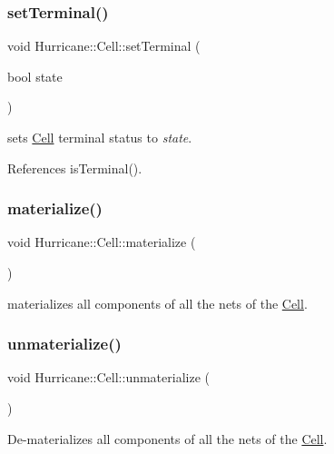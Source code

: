 \subsubsection{\texorpdfstring{set\+Terminal()}{setTerminal()}}
{\footnotesize\ttfamily void Hurricane\+::\+Cell\+::set\+Terminal (\begin{DoxyParamCaption}\item[{bool}]{state }\end{DoxyParamCaption})\hspace{0.3cm}{\ttfamily [inline]}}

sets \mbox{\hyperlink{classHurricane_1_1Cell}{Cell}} terminal status to {\itshape state}. 

References is\+Terminal().

\mbox{\label{classHurricane_1_1Cell_affefc597317063857f4904d4b16d5d4f}} 
\subsubsection{\texorpdfstring{materialize()}{materialize()}}
{\footnotesize\ttfamily void Hurricane\+::\+Cell\+::materialize (\begin{DoxyParamCaption}{ }\end{DoxyParamCaption})}

materializes all components of all the nets of the \mbox{\hyperlink{classHurricane_1_1Cell}{Cell}}. \mbox{\label{classHurricane_1_1Cell_a40c9ba4e3fc76b0c4bc58af8dcaddf53}} 
\subsubsection{\texorpdfstring{unmaterialize()}{unmaterialize()}}
{\footnotesize\ttfamily void Hurricane\+::\+Cell\+::unmaterialize (\begin{DoxyParamCaption}{ }\end{DoxyParamCaption})}

De-\/materializes all components of all the nets of the \mbox{\hyperlink{classHurricane_1_1Cell}{Cell}}. \mbox{\label{classHurricane_1_1Cell_a092f53c7f517ecc70d9ba375296c5d5b}} 
